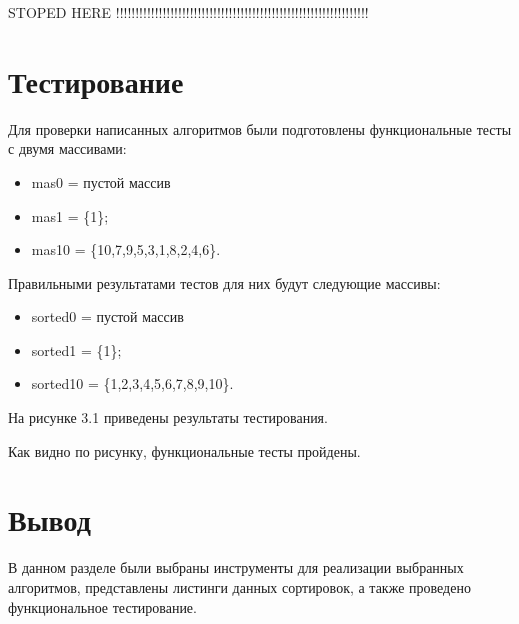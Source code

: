 STOPED HERE !!!!!!!!!!!!!!!!!!!!!!!!!!!!!!!!!!!!!!!!!!!!!!!!!!!!!!!!!!!!!!!!!

\section{Тестирование}
Для проверки написанных алгоритмов были подготовлены функциональные тесты с двумя массивами:
\begin{itemize}
	\item mas0 = пустой массив
	\item mas1 = \{1\};
	\item mas10 = \{10,7,9,5,3,1,8,2,4,6\}.
\end{itemize}

\newpage
Правильными результатами тестов для них будут следующие массивы:
\begin{itemize}
	\item sorted0 = пустой массив
	\item sorted1 = \{1\};
	\item sorted10 = \{1,2,3,4,5,6,7,8,9,10\}.
\end{itemize}

На рисунке 3.1 приведены результаты тестирования.


Как видно по рисунку, функциональные тесты пройдены.

\section{Вывод}
В данном разделе были выбраны инструменты для реализации выбранных алгоритмов, представлены листинги данных сортировок, а также проведено функциональное тестирование.